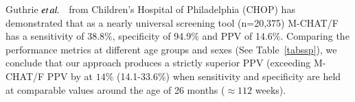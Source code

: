 \documentclass[onecolumn, compsoc,11pt]{IEEEtran}
\makeatletter
\renewcommand\subsection{\@startsection {subsection}{2}{\z@}%
                                   {0ex \@plus -1.75ex \@minus -1.2ex}%
                                   {0ex \@plus.0ex}%
                                   {\fontsize{11}{11}\selectfont\bfseries\sffamily\color{black}}}
\makeatother
\begin{document}
%
Guthrie $\textit{et} \mspace{3mu} \textit{al.}$~\cite{pmid31562252} from Children's Hospital of Philadelphia (CHOP) has  demonstrated that  as a nearly universal screening tool (n=20,375) M-CHAT/F has a sensitivity of 38.8\%, specificity of 94.9\% and PPV of 14.6\%.%
%
Comparing the performance metrics  at different age groups and sexes  (See Table~\ref{tabssp}), we conclude that our approach produces a strictly superior PPV (exceeding M-CHAT/F PPV by at  $14\%$ (14.1-33.6\%) when sensitivity and specificity are held at comparable values around the age of 26 months ($\approx 112$ weeks). %
\end{document}
